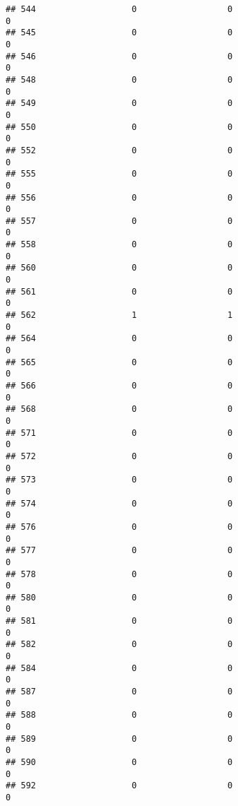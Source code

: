 \documentclass[
]{article}
\begin{document}
\begin{verbatim}
## 544                   0                  0                              0
## 545                   0                  0                              0
## 546                   0                  0                              0
## 548                   0                  0                              0
## 549                   0                  0                              0
## 550                   0                  0                              0
## 552                   0                  0                              0
## 555                   0                  0                              0
## 556                   0                  0                              0
## 557                   0                  0                              0
## 558                   0                  0                              0
## 560                   0                  0                              0
## 561                   0                  0                              0
## 562                   1                  1                              0
## 564                   0                  0                              0
## 565                   0                  0                              0
## 566                   0                  0                              0
## 568                   0                  0                              0
## 571                   0                  0                              0
## 572                   0                  0                              0
## 573                   0                  0                              0
## 574                   0                  0                              0
## 576                   0                  0                              0
## 577                   0                  0                              0
## 578                   0                  0                              0
## 580                   0                  0                              0
## 581                   0                  0                              0
## 582                   0                  0                              0
## 584                   0                  0                              0
## 587                   0                  0                              0
## 588                   0                  0                              0
## 589                   0                  0                              0
## 590                   0                  0                              0
## 592                   0                  0                              0

\end{verbatim}
\end{document}

